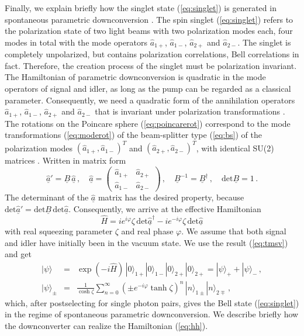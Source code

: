 \documentclass[12pt,amsmath,amssymb]{article}
\numberwithin{equation}{section}
\begin{document}
Finally, we explain briefly how the singlet state (\ref{eq:singlet})
is generated in spontaneous parametric downconversion
\cite{MandelWolf}. The spin singlet (\ref{eq:singlet}) refers
to the polarization state of two light beams with two polarization
modes each, four modes in total with the mode operators
$\hat{a}_{1+}$, $\hat{a}_{1-}$, $\hat{a}_{2+}$ and
$\hat{a}_{2-}$. The singlet is completely unpolarized, but
contains polarization correlations, Bell correlations \cite{Bell}
in fact. Therefore, the creation process of the singlet
must be polarization invariant. The Hamiltonian of parametric
downconversion is quadratic in the mode operators
of signal and idler, as long as the pump can be regarded
as a classical parameter. Consequently, we need a quadratic form
of the annihilation operators $\hat{a}_{1+}$, $\hat{a}_{1-}$,
$\hat{a}_{2+}$ and $\hat{a}_{2-}$ that is invariant under
polarization transformations \cite{Lehner}.
The rotations on the Poincare sphere (\ref{eq:poincarerot})
correspond to the mode transformations (\ref{eq:moderot})
of the beam-splitter type (\ref{eq:bs}) of the polarization modes
$(\hat{a}_{1+}, \hat{a}_{1-})^T$ and
$(\hat{a}_{2+}, \hat{a}_{2-})^T$, with identical SU(2) matrices
\cite{Cornwell}. Written in matrix form
\begin{equation}
\underline{\hat{a}}'=\underline{B}\,\underline{\hat{a}}
\,,\quad
\underline{\hat{a}} =
\left(
    \begin{array}{cc}
      \hat{a}_{1+} & \hat{a}_{2+} \\
      \hat{a}_{1-} & \hat{a}_{2-}
    \end{array}
\right)
\,,\quad
\underline{B}^{-1}=\underline{B}^\dagger
\,,\quad
\mathrm{det}\underline{B}=1\,.
\end{equation}
The determinant of the $\underline{\hat{a}}$ matrix has the desired
property, because $\mathrm{det}\underline{\hat{a}}'=
\mathrm{det}\underline{B}\,\mathrm{det}\underline{\hat{a}}$.
Consequently, we arrive at the effective Hamiltonian
\begin{equation}
\label{eq:hh}
\hat{H} =
i e^{i\varphi}\zeta\,\mathrm{det}\underline{\hat{a}}^\dagger -
i e^{-i\varphi}\zeta\,\mathrm{det}\underline{\hat{a}}
\end{equation}
with real squeezing parameter $\zeta$ and real phase $\varphi$.
We assume that both signal and idler have initially been in the
vacuum state. We use the result (\ref{eq:tmsv}) and get
\begin{eqnarray}
|\psi\rangle &=& \exp(-i\hat{H})\,
|0\rangle_{1+}|0\rangle_{1-}|0\rangle_{2+}|0\rangle_{2+}
= |\psi\rangle_+ + |\psi\rangle_- \,,
\nonumber\\
|\psi\rangle_\pm &=&
\frac{1}{\cosh\zeta} \sum_{n=0}^\infty
\left(\pm e^{-i\varphi}\tanh\zeta\right)^n\,
|n\rangle_{1\pm} |n\rangle_{2\mp} \,,
\label{eq:polinv}
\end{eqnarray}
which, after postselecting for single photon pairs, gives
the Bell state (\ref{eq:singlet}) in the regime of spontaneous
parametric downconversion.
We describe briefly how the
downconverter can realize the Hamiltonian (\ref{eq:hh}).
\end{document}
